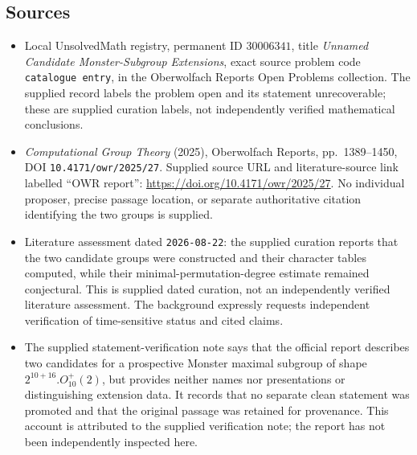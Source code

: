 \documentclass[11pt]{article}
\begin{document}
\subsection{Sources}
\begin{itemize}
\item Local UnsolvedMath registry, permanent ID \(30006341\), title \emph{Unnamed Candidate Monster-Subgroup Extensions}, exact source problem code \texttt{catalogue entry}, in the Oberwolfach Reports Open Problems collection. The supplied record labels the problem open and its statement unrecoverable; these are supplied curation labels, not independently verified mathematical conclusions.
\item \emph{Computational Group Theory} (2025), Oberwolfach Reports, pp.\ 1389--1450, DOI \texttt{10.4171/owr/2025/27}. Supplied source URL and literature-source link labelled ``OWR report'': \url{https://doi.org/10.4171/owr/2025/27}. No individual proposer, precise passage location, or separate authoritative citation identifying the two groups is supplied.
\item Literature assessment dated \texttt{2026-08-22}: the supplied curation reports that the two candidate groups were constructed and their character tables computed, while their minimal-permutation-degree estimate remained conjectural. This is supplied dated curation, not an independently verified literature assessment. The background expressly requests independent verification of time-sensitive status and cited claims.
\item The supplied statement-verification note says that the official report describes two candidates for a prospective Monster maximal subgroup of shape \(2^{10+16}.O_{10}^{+}(2)\), but provides neither names nor presentations or distinguishing extension data. It records that no separate clean statement was promoted and that the original passage was retained for provenance. This account is attributed to the supplied verification note; the report has not been independently inspected here.
\end{itemize}
\end{document}
